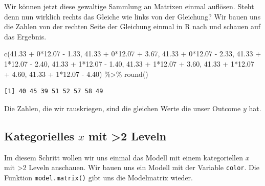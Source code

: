 \documentclass[
  letterpaper,
]{scrbook}
\newenvironment{Shaded}{\begin{snugshade}}{\end{snugshade}}
\newcommand{\DecValTok}[1]{\textcolor[rgb]{0.68,0.00,0.00}{#1}}
\newcommand{\FloatTok}[1]{\textcolor[rgb]{0.68,0.00,0.00}{#1}}
\newcommand{\FunctionTok}[1]{\textcolor[rgb]{0.28,0.35,0.67}{#1}}
\newcommand{\NormalTok}[1]{\textcolor[rgb]{0.00,0.23,0.31}{#1}}
\newcommand{\SpecialCharTok}[1]{\textcolor[rgb]{0.37,0.37,0.37}{#1}}
\begin{document}
Wir können jetzt diese gewaltige Sammlung an Matrixen einmal auflösen.
Steht denn nun wirklich rechts das Gleiche wie links von der Gleichung?
Wir bauen uns die Zahlen von der rechten Seite der Gleichung einmal in R
nach und schauen auf das Ergebnis.

\begin{Shaded}
\begin{Highlighting}[]
\FunctionTok{c}\NormalTok{(}\FloatTok{41.33} \SpecialCharTok{+} \DecValTok{0}\SpecialCharTok{*}\FloatTok{12.07} \SpecialCharTok{{-}} \FloatTok{1.33}\NormalTok{,}
  \FloatTok{41.33} \SpecialCharTok{+} \DecValTok{0}\SpecialCharTok{*}\FloatTok{12.07} \SpecialCharTok{+} \FloatTok{3.67}\NormalTok{,}
  \FloatTok{41.33} \SpecialCharTok{+} \DecValTok{0}\SpecialCharTok{*}\FloatTok{12.07} \SpecialCharTok{{-}} \FloatTok{2.33}\NormalTok{,}
  \FloatTok{41.33} \SpecialCharTok{+} \DecValTok{1}\SpecialCharTok{*}\FloatTok{12.07} \SpecialCharTok{{-}} \FloatTok{2.40}\NormalTok{,}
  \FloatTok{41.33} \SpecialCharTok{+} \DecValTok{1}\SpecialCharTok{*}\FloatTok{12.07} \SpecialCharTok{{-}} \FloatTok{1.40}\NormalTok{,}
  \FloatTok{41.33} \SpecialCharTok{+} \DecValTok{1}\SpecialCharTok{*}\FloatTok{12.07} \SpecialCharTok{+} \FloatTok{3.60}\NormalTok{,}
  \FloatTok{41.33} \SpecialCharTok{+} \DecValTok{1}\SpecialCharTok{*}\FloatTok{12.07} \SpecialCharTok{+} \FloatTok{4.60}\NormalTok{,}
  \FloatTok{41.33} \SpecialCharTok{+} \DecValTok{1}\SpecialCharTok{*}\FloatTok{12.07} \SpecialCharTok{{-}} \FloatTok{4.40}\NormalTok{) }\SpecialCharTok{\%\textgreater{}\%} \FunctionTok{round}\NormalTok{() }
\end{Highlighting}
\end{Shaded}

\begin{verbatim}
[1] 40 45 39 51 52 57 58 49
\end{verbatim}

Die Zahlen, die wir rauskriegen, sind die gleichen Werte die unser
Outcome \(y\) hat.

\hypertarget{kategorielles-x-mit-2-leveln-1}{%
\subsection{\texorpdfstring{Kategorielles \(x\) mit \textgreater2
Leveln}{Kategorielles x mit \textgreater2 Leveln}}\label{kategorielles-x-mit-2-leveln-1}}

Im diesem Schritt wollen wir uns einmal das Modell mit einem
kategoriellen \(x\) mit \textgreater2 Leveln anschauen. Wir bauen uns
ein Modell mit der Variable \texttt{color}. Die Funktion
\texttt{model.matrix()} gibt uns die Modelmatrix wieder.
\end{document}
